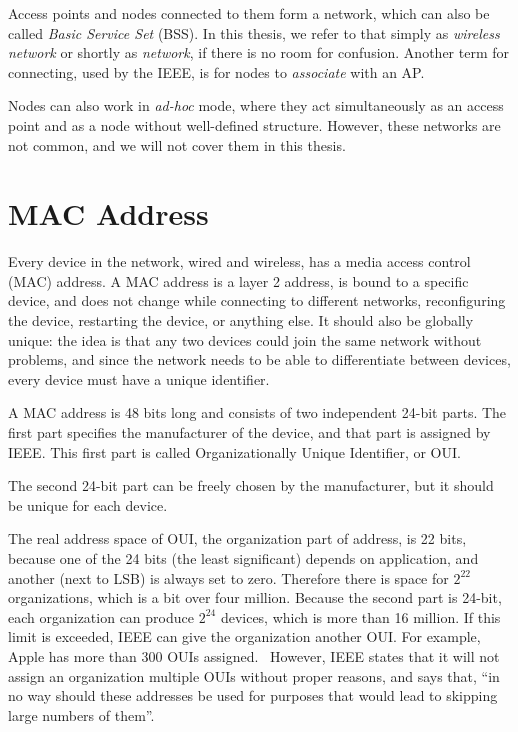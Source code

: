 \documentclass[12pt,a4paper,oneside,pdftex]{report}
\begin{document}
Access points and nodes connected to them form a network, which can also be called \emph{Basic Service Set} (BSS). In this thesis, we refer to that simply as \emph{wireless network} or shortly as \emph{network}, if there is no room for confusion. Another term for connecting, used by the IEEE, is for nodes to \emph{associate} with an AP.

Nodes can also work in \emph{ad-hoc} mode, where they act simultaneously as an access point and as a node without well-defined structure. However, these networks are not common, and we will not cover them in this thesis.


\section{MAC Address}
\label{sec:MAC}

Every device in the network, wired and wireless, has a media access control (MAC) address. A MAC address is a layer 2 address, is bound to a specific device, and does not change while connecting to different networks, reconfiguring the device, restarting the device, or anything else. It should also be globally unique: the idea is that any two devices could join the same network without problems, and since the network needs to be able to differentiate between devices, every device must have a unique identifier.~\cite{802_overview}

A MAC address is 48 bits long and consists of two independent 24-bit parts. The first part specifies the manufacturer of the device, and that part is assigned by IEEE. This first part is called Organizationally Unique Identifier, or OUI.

The second 24-bit part can be freely chosen by the manufacturer, but it should be unique for each device. 

The real address space of OUI, the organization part of address, is 22 bits, because one of the 24 bits (the least significant) depends on application, and another (next to LSB) is always set to zero. Therefore there is space for $2^{22}$ organizations, which is a bit over four million. Because the second part is 24-bit, each organization can produce $2^{24}$ devices, which is more than 16 million. If this limit is exceeded, IEEE can give the organization another OUI. For example, Apple has more than 300 OUIs assigned.~\cite{oui_listing} However, IEEE states that it will not assign an organization multiple OUIs without proper reasons, and says that, ``in no way should these addresses be used for purposes that would lead to skipping large numbers of them''.~\cite{802_overview} 
\end{document}
